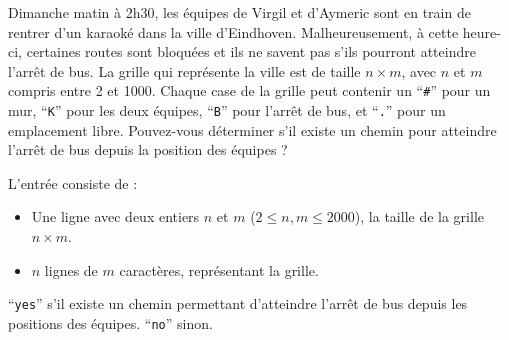 \problemname{\problemyamlname}


Dimanche matin à 2h30, les équipes de Virgil et d'Aymeric sont en train de rentrer d'un karaoké dans la ville d'Eindhoven.
Malheureusement, à cette heure-ci, certaines routes sont bloquées et ils ne savent pas s'ils pourront atteindre l'arrêt de bus. 
La grille qui représente la ville est de taille $n \times m$, avec $n$ et $m$ compris entre 2 et 1000.
Chaque case de la grille peut contenir un ``\verb|#|'' pour un mur, ``\verb|K|'' pour les deux équipes, ``\verb|B|'' pour l'arrêt de bus, et ``\verb|.|'' pour un emplacement libre.
Pouvez-vous déterminer s'il existe un chemin pour atteindre l'arrêt de bus depuis la position des équipes ?

\begin{Input}
	L'entrée consiste de :
	\begin{itemize}
		\item Une ligne avec deux entiers $n$ et $m$ ($2 \le n, m \le 2000$), la taille de la grille $n \times m$.
		\item $n$ lignes de $m$ caractères, représentant la grille.
	\end{itemize}
\end{Input}

\begin{Output}
	``\verb|yes|'' s'il existe un chemin permettant d'atteindre l'arrêt de bus depuis les positions des équipes.
	``\verb|no|'' sinon.
\end{Output}
